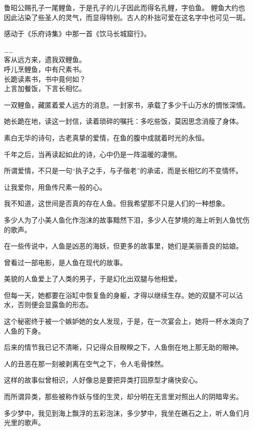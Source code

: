 \documentclass[12pt,a4paper]{article}
\def\blankrev{\vspace{1ex}}									%
\begin{document}
		鲁昭公赐孔子一尾鲤鱼，于是孔子的儿子因此而得名孔鲤，字伯鱼。
		鲤鱼大约也因此沾染了些圣人的灵气，而显得特别。古人的朴拙可爱在这名字中也可见一斑。

		感动于《乐府诗集》中那一首《饮马长城窟行》。

		\shortpoem{}{}{}
		…… \\
		客从远方来，遗我双鲤鱼。\\
		呼儿烹鲤鱼，中有尺素书。\\
		长跪读素书，书中竟何如？\\
		上言加餐饭，下言长相忆。\\
		\endshortpoem

		一双鲤鱼，藏匿着爱人远方的消息。一封家书，承载了多少千山万水的惆怅深情。\par
		她长跪在地，读这一封信，读着琐碎的嘱托：多吃些饭，莫因思念消瘦了身体。\par
		素白无华的诗句，古老真挚的爱情，在鱼的腹中成就着时光的永恒。\par
		千年之后，当再读起如此的诗，心中仍是一阵温暖的凄恻。

		\blankrev
		所谓爱情，不只是一句“执子之手，与子偕老”的承诺，而是长相忆的不变情怀。\par
		让我爱你，用鱼传尺素一般的心。

		\blankrev
		我不知道，这世间是否真的存在人鱼。但我希望那不只是人们的一种想象。

		\blankrev
		多少人为了小美人鱼化作泡沫的故事黯然下泪，多少人在梦境的海上听到人鱼忧伤的歌声。\par
		在一些传说中，人鱼是凶恶的海妖，但更多的故事里，她们是美丽善良的姑娘。

		\blankrev
		曾看过一部电影，是人鱼在现代的故事。\par
		美貌的人鱼爱上了人类的男子，于是幻化出双腿与他相爱。\par
		但每一天，她都要在浴缸中恢复鱼的身躯，才得以继续生存。她的双腿不可以沾水，否则便会显露鱼的形态。\par
		这个秘密终于被一个嫉妒她的女人发现，于是，在一次宴会上，她将一杯水泼向了人鱼的下身。\par
		后来的情节我已记不清晰，只记得众目睽睽之下，人鱼倒在地上那无助的眼神。\par
		人的丑恶在那一刻被剥离在空气之下，令人毛骨悚然。

		\blankrev
		这样的故事似曾相识，人好像总是要把异类打回原型才痛快安心。\par
		而所谓异类，那些被称作妖与怪的生灵，却分明在无言里对照出人的阴暗卑劣。\par
		多少梦中，我见到海上飘浮的五彩泡沫，多少梦中，我坐在礁石之上，听人鱼们月光里的歌声。
\end{document}
